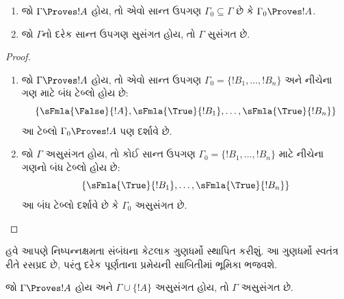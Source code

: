 \begin{prop}[સઘનતા]
  \begin{enumerate}
  \item જો $\Gamma \Proves !A$ હોય, તો એવો સાન્ત ઉપગણ
    $\Gamma_0 \subseteq \Gamma$ છે કે $\Gamma_0 \Proves !A$.
  \item જો $\Gamma$નો દરેક સાન્ત ઉપગણ સુસંગત હોય, તો $\Gamma$ સુસંગત છે.
  \end{enumerate}
\end{prop}

\begin{proof}
  \begin{enumerate}
    \item જો $\Gamma \Proves !A$ હોય, તો એવો સાન્ત ઉપગણ
      $\Gamma_0 = \{!B_1, \dots, !B_n\}$ અને નીચેના ગણ માટે બંધ
      ટેબ્લો હોય છે:
      \[
      \{\sFmla{\False}{!A}, \sFmla{\True}{!B_1}, \dots, \sFmla{\True}{!B_n}\}
      \]
      આ ટેબ્લો $\Gamma_0 \Proves !A$ પણ દર્શાવે છે.
    \item જો $\Gamma$ અસુસંગત હોય, તો કોઈ સાન્ત ઉપગણ
      $\Gamma_0 = \{!B_1, \dots, !B_n\}$ માટે નીચેના ગણનો બંધ
      ટેબ્લો હોય છે:
      \[
      \{\sFmla{\True}{!B_1}, \dots, \sFmla{\True}{!B_n}\}
      \]
      આ બંધ ટેબ્લો દર્શાવે છે કે $\Gamma_0$ અસુસંગત છે.
  \end{enumerate}
\end{proof}
\endgroup


\begingroup
\makeatletter{}\makeatother


\label{guunit:OLP-0106}


હવે આપણે નિષ્પન્નક્ષમતા સંબંધના કેટલાક ગુણધર્મો સ્થાપિત કરીશું. આ
ગુણધર્મો સ્વતંત્ર રીતે રસપ્રદ છે, પરંતુ દરેક પૂર્ણતાના પ્રમેયની
સાબિતીમાં ભૂમિકા ભજવશે.

\begin{prop}
  જો $\Gamma \Proves !A$ હોય અને $\Gamma \cup \{!A\}$ અસુસંગત હોય,
  તો $\Gamma$ અસુસંગત છે.
\end{prop}

